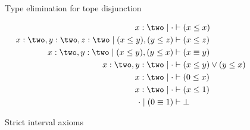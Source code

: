\documentclass{article}
\theoremstyle{named}
\theoremstyle{remark}
\theoremstyle{definition}
\begin{document}
  \begin{figure}
    \centering
    \caption{Type elimination for tope disjunction}
    \label{fig:tope-or}
  \end{figure}
  \begin{figure}
    \begin{align*}
        x:\two \mid\cdot &\types (x\le x)\\
        x:\two, y:\two, z:\two \mid (x\le y), (y\le z) &\types (x\le z)\\
        x:\two, y:\two \mid (x\le y), (y\le x) &\types (x\jdeq y)\\
        x:\two, y:\two \mid\cdot &\types (x\le y) \lor (y\le x)\\
        x:\two \mid\cdot &\types (0\le x)\\
        x:\two \mid\cdot &\types (x\le 1)\\
        \cdot\mid (0\jdeq 1) &\types \bot
      \end{align*}
      \caption{Strict interval axioms}
      \label{fig:Strict-ax}
  \end{figure}
\end{document}
